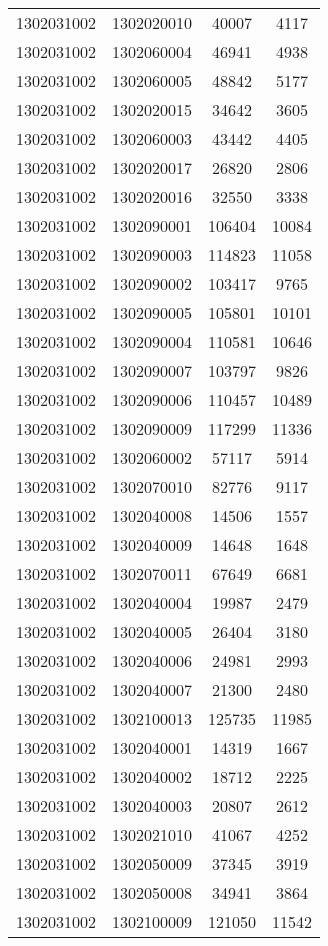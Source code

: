 \begin{longtable}[h]{llcc}
		1302031002 & 1302020010 & 40007 & 4117\\
		1302031002 & 1302060004 & 46941 & 4938\\
		1302031002 & 1302060005 & 48842 & 5177\\
		1302031002 & 1302020015 & 34642 & 3605\\
		1302031002 & 1302060003 & 43442 & 4405\\
		1302031002 & 1302020017 & 26820 & 2806\\
		1302031002 & 1302020016 & 32550 & 3338\\
		1302031002 & 1302090001 & 106404 & 10084\\
		1302031002 & 1302090003 & 114823 & 11058\\
		1302031002 & 1302090002 & 103417 & 9765\\
		1302031002 & 1302090005 & 105801 & 10101\\
		1302031002 & 1302090004 & 110581 & 10646\\
		1302031002 & 1302090007 & 103797 & 9826\\
		1302031002 & 1302090006 & 110457 & 10489\\
		1302031002 & 1302090009 & 117299 & 11336\\
		1302031002 & 1302060002 & 57117 & 5914\\
		1302031002 & 1302070010 & 82776 & 9117\\
		1302031002 & 1302040008 & 14506 & 1557\\
		1302031002 & 1302040009 & 14648 & 1648\\
		1302031002 & 1302070011 & 67649 & 6681\\
		1302031002 & 1302040004 & 19987 & 2479\\
		1302031002 & 1302040005 & 26404 & 3180\\
		1302031002 & 1302040006 & 24981 & 2993\\
		1302031002 & 1302040007 & 21300 & 2480\\
		1302031002 & 1302100013 & 125735 & 11985\\
		1302031002 & 1302040001 & 14319 & 1667\\
		1302031002 & 1302040002 & 18712 & 2225\\
		1302031002 & 1302040003 & 20807 & 2612\\
		1302031002 & 1302021010 & 41067 & 4252\\
		1302031002 & 1302050009 & 37345 & 3919\\
		1302031002 & 1302050008 & 34941 & 3864\\
		1302031002 & 1302100009 & 121050 & 11542\\

\end{longtable}
